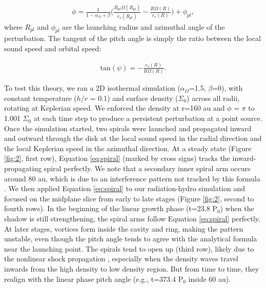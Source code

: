 \documentclass[twocolumn,tighten]{aastex631}
\begin{document}
\begin{align}
\phi = \frac{1}{1-\alpha_\Omega+\beta}\Bigg(\frac{R_{pl}\Omega(R_{pl})}{c_s(R_{pl})} - \frac{R\Omega(R)}{c_s(R)}\Bigg) + \phi_{pl},
\label{eq:spiral}
\end{align}
where $R_{pl}$ and $\phi_{pl}$ are the launching radius and azimuthal angle of the perturbation. The tangent of the pitch angle is simply the ratio between the local sound speed and orbital speed:

\begin{align}
\mathrm{tan}(\psi) = - \frac{c_s(R)}{R\Omega(R)}.
\end{align}

To test this theory, we ran a 2D isothermal simulation ($\alpha_\Omega$=1.5, $\beta$=0), with constant temperature ($h/r$ = 0.1) and surface density ($\Sigma_0$) across all radii, rotating at Keplerian speed. We enforced the density at r=160 au and $\phi$ = $\pi$ to 1.001 $\Sigma_0$ at each time step to produce a persistent perturbation at a point source. Once the simulation started, two spirals were launched and propagated inward and outward through the disk at the local sound speed in the radial direction and the local Keplerian speed in the azimuthal direction. At a steady state (Figure \ref{fig:2}, first row), Equation \ref{eq:spiral} (marked by cross signs) tracks the inward-propagating spiral perfectly. We note that a secondary inner spiral arm occurs around 80 au, which is due to an interference pattern not tracked by this formula \citep{bae17,bae18a,bae18b,miranda19}. We then applied Equation \ref{eq:spiral} to our radiation-hydro simulation and focused on the midplane slice from early to late stages (Figure \ref{fig:2}, second to fourth rows). In the beginning of the linear growth phase (t=23.8 P$_0$) when the shadow is still strengthening, the spiral arms follow Equation \ref{eq:spiral} perfectly. At later stages, vortices form inside the cavity and ring, making the pattern unstable, even though the pitch angle tends to agree with the analytical formula near the launching point. The spirals tend to open up (third row), likely due to the nonlinear shock propagation \citep{goodman01,zhu15}, especially when the density waves travel inwards from the high density to low density region. But from time to time, they realign with the linear phase pitch angle (e.g., t=373.4 P$_0$ inside 60 au).
\end{document}
